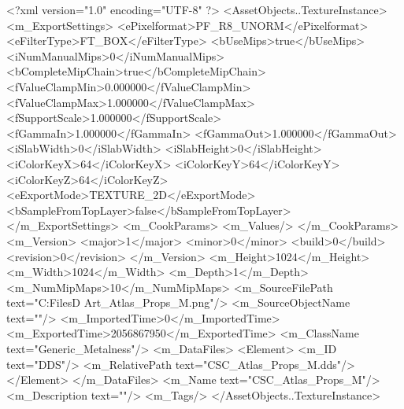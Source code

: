 <?xml version="1.0" encoding="UTF-8" ?>
<AssetObjects..TextureInstance>
	<m_ExportSettings>
		<ePixelformat>PF_R8_UNORM</ePixelformat>
		<eFilterType>FT_BOX</eFilterType>
		<bUseMips>true</bUseMips>
		<iNumManualMips>0</iNumManualMips>
		<bCompleteMipChain>true</bCompleteMipChain>
		<fValueClampMin>0.000000</fValueClampMin>
		<fValueClampMax>1.000000</fValueClampMax>
		<fSupportScale>1.000000</fSupportScale>
		<fGammaIn>1.000000</fGammaIn>
		<fGammaOut>1.000000</fGammaOut>
		<iSlabWidth>0</iSlabWidth>
		<iSlabHeight>0</iSlabHeight>
		<iColorKeyX>64</iColorKeyX>
		<iColorKeyY>64</iColorKeyY>
		<iColorKeyZ>64</iColorKeyZ>
		<eExportMode>TEXTURE_2D</eExportMode>
		<bSampleFromTopLayer>false</bSampleFromTopLayer>
	</m_ExportSettings>
	<m_CookParams>
		<m_Values/>
	</m_CookParams>
	<m_Version>
		<major>1</major>
		<minor>0</minor>
		<build>0</build>
		<revision>0</revision>
	</m_Version>
	<m_Height>1024</m_Height>
	<m_Width>1024</m_Width>
	<m_Depth>1</m_Depth>
	<m_NumMipMaps>10</m_NumMipMaps>
	<m_SourceFilePath text="C:\Users\Shadow\Desktop\Working Files\3D Art\Textures\CSC_Atlas_Props_M.png"/>
	<m_SourceObjectName text=""/>
	<m_ImportedTime>0</m_ImportedTime>
	<m_ExportedTime>2056867950</m_ExportedTime>
	<m_ClassName text="Generic_Metalness"/>
	<m_DataFiles>
		<Element>
			<m_ID text="DDS"/>
			<m_RelativePath text="CSC_Atlas_Props_M.dds"/>
		</Element>
	</m_DataFiles>
	<m_Name text="CSC_Atlas_Props_M"/>
	<m_Description text=""/>
	<m_Tags/>
</AssetObjects..TextureInstance>

